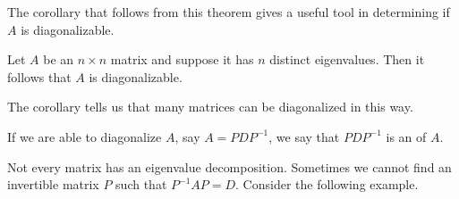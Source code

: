 \documentclass{ximera}
\begin{document}
The corollary that follows from this theorem gives a useful tool in determining if $A$ is diagonalizable.

\begin{corollary}\label{th:distincteigenvalues}
Let $A$ be an $n \times n$ matrix and suppose it has $n$ distinct eigenvalues. Then it follows that $A$ is diagonalizable.
\end{corollary}

The corollary tells us that many matrices can be diagonalized in this way.
\begin{definition}\label{def:eigdecomposition}
If we are able to diagonalize $A$, say $A=PDP^{-1}$, we say that $PDP^{-1}$ is an  of $A$.
\end{definition}
Not every matrix has an eigenvalue decomposition. Sometimes we cannot find an invertible matrix $P$ such that $P^{-1}AP=D$.  Consider the following example.
\end{document}

